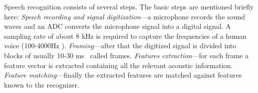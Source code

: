  Speech recognition consists of several steps. The basic steps are mentioned briefly here:
\textit{Speech recording and signal digitization}---a microphone records the sound waves and an ADC converts the microphone signal into a digital signal. A sampling rate of about 8 kHz is required to capture the frequencies of a human voice (100-4000Hz \cite{Bernal-Ruiz2005MicrocontrollerSystems}). \textit{Framing}---after that the digitized signal is divided into blocks of usually 10-30 ms~\cite{gaikwad2010review,delaney2002low,delaney2005energy} called frames. \textit{Features extraction}---for each frame a feature vector is extracted containing all the relevant acoustic information. \textit{Feature matching}---finally the extracted features are matched against features known to the recognizer. 

